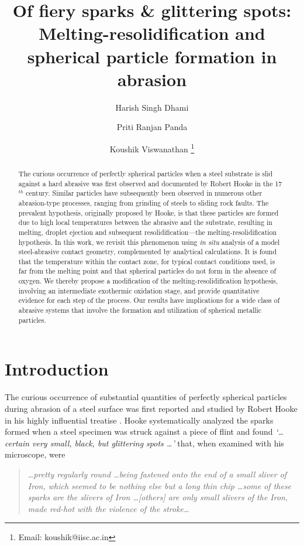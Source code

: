 \documentclass[11pt]{article}
\title{\vspace{-3em} \large \textbf{Of fiery sparks \& glittering spots: Melting-resolidification and spherical particle formation in abrasion} }
\author[1]{\normalsize Harish Singh Dhami}
\author[1]{\normalsize Priti Ranjan Panda}
\author[1]{\normalsize Koushik Viswanathan \thanks{Email: koushik@iisc.ac.in}}
\affil[1]{\normalsize \textsl{Dept. of Mechanical Engineering, IISc, Bangalore}}
\newcommand{\txq}[1]{\textsl{#1}}
\begin{document}
\maketitle
\thispagestyle{plain}
\begin{abstract}
  The curious occurrence of perfectly spherical particles when a steel substrate is slid against a hard abrasive was first observed and documented by Robert Hooke in the 17$^{th}$ century. Similar particles have subsequently been observed in numerous other abrasion-type processes, ranging from grinding of steels to sliding rock faults. The prevalent hypothesis, originally proposed by Hooke, is that these particles are formed due to high local temperatures between the abrasive and the substrate, resulting in melting, droplet ejection and subsequent resolidification---the melting-resolidification hypothesis. In this work, we revisit this phenomenon using \emph{in situ} analysis of a model steel-abrasive contact geometry, complemented by analytical calculations. It is found that the temperature within the contact zone, for typical contact conditions used, is far from the melting point and that spherical particles do not form in the absence of oxygen. We thereby propose a modification of the melting-resolidification hypothesis, involving an intermediate exothermic oxidation stage, and provide quantitative evidence for each step of the process. Our results have implications for a wide class of abrasive systems that involve the formation and utilization of spherical metallic particles.          
\end{abstract}
\hrulefill
\section{Introduction}
The curious occurrence of substantial quantities of perfectly spherical particles during abrasion of a steel surface was first reported and studied by Robert Hooke in his highly influential treatise \cite{HookeMicrographia}. Hooke systematically analyzed the sparks formed when a steel specimen was struck against a piece of flint and found \txq{\lq \ldots certain very small, black, but glittering spots \ldots \rq } that, when examined with his microscope, were
\begin{quotation}
  \txq{\ldots pretty regularly round \ldots being fastened onto the end of a small sliver of Iron, which seemed to be nothing else but a long thin chip \ldots some of these sparks are the slivers of Iron \ldots [others] are only small slivers of the Iron, made red-hot with the violence of the stroke\ldots}
\end{quotation}
\end{document}
